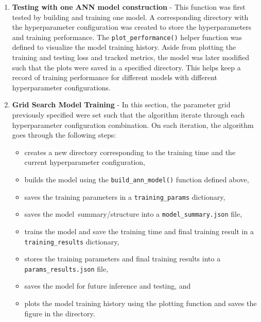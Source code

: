 \documentclass[a4paper]{article}
\begin{document}
\begin{enumerate}
    \item \textbf{Testing with one ANN model construction} - This function was first tested by building and training one model. A corresponding directory with the hyperparameter configuration was created to store the hyperparameters and training performance. The \lstinline{plot_performance()} helper function was defined to visualize the model training history. Aside from plotting the training and testing loss and tracked metrics, the model was later modified such that the plots were saved in a specified directory. This helps keep a record of training performance for different models with different hyperparameter configurations.

    \item \textbf{Grid Search Model Training} - In this section, the parameter grid previously specified were set such that the algorithm iterate through each hyperparameter configuration combination. On each iteration, the algorithm goes through the following steps:
    \begin{itemize}
        \itemsep=-5pt
        \item creates a new directory corresponding to the training time and the current hyperparameter configuration, 
        \item builds the model using the \lstinline{build_ann_model()} function defined above, 
        \item saves the training parameters in a \lstinline{training_params} dictionary, 
        \item saves the model\ summary/structure into a \lstinline{model_summary.json} file, 
        \item trains the model and save the training time and final training result in a \lstinline{training_results} dictionary, 
        \item stores the training parameters and final training results into a \lstinline{params_results.json} file, 
        \item saves the model for future inference and testing, and 
        \item plots the model training history using the plotting function and saves the figure in the directory.
    \end{itemize}
    

\end{enumerate}
\end{document}
